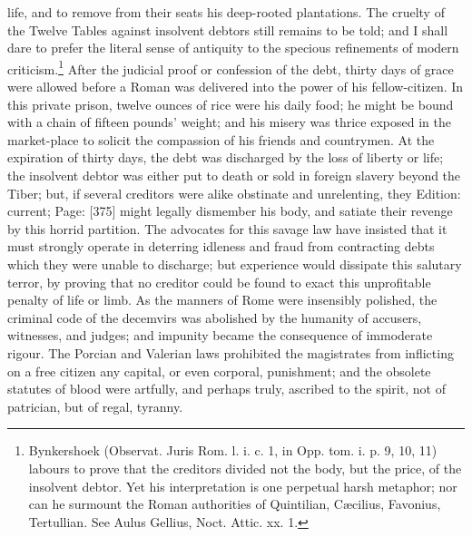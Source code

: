 life, and to remove from their seats his deep-rooted plantations. The cruelty of the Twelve Tables against insolvent debtors still remains to be told; and I shall dare to prefer the literal sense of antiquity to the specious refinements of modern criticism.\footnote{Bynkershoek (Observat. Juris Rom. l. i. c. 1, in Opp. tom. i. p. 9, 10, 11) labours to prove that the creditors divided not the body, but the price, of the insolvent debtor. Yet his interpretation is one perpetual harsh metaphor; nor can he surmount the Roman authorities of Quintilian, Cæcilius, Favonius, Tertullian. See Aulus Gellius, Noct. Attic. xx. 1.} After the judicial proof or confession of the debt, thirty days of grace were allowed before a Roman was delivered into the power of his fellow-citizen. In this private prison, twelve ounces of rice were his daily food; he might be bound with a chain of fifteen pounds\texthebrew{}’ weight; and his misery was thrice exposed in the market-place to solicit the compassion of his friends and countrymen. At the expiration of thirty days, the debt was discharged by the loss of liberty or life; the insolvent debtor was either put to death or sold in foreign slavery beyond the Tiber; but, if several creditors were alike obstinate and unrelenting, they Edition: current; Page: [375] might legally dismember his body, and satiate their revenge by this horrid partition. The advocates for this savage law have insisted that it must strongly operate in deterring idleness and fraud from contracting debts which they were unable to discharge; but experience would dissipate this salutary terror, by proving that no creditor could be found to exact this unprofitable penalty of life or limb. As the manners of Rome were insensibly polished, the criminal code of the decemvirs was abolished by the humanity of accusers, witnesses, and judges; and impunity became the consequence of immoderate rigour. The Porcian and Valerian laws prohibited the magistrates from inflicting on a free citizen any capital, or even corporal, punishment; and the obsolete statutes of blood were artfully, and perhaps truly, ascribed to the spirit, not of patrician, but of regal, tyranny.

